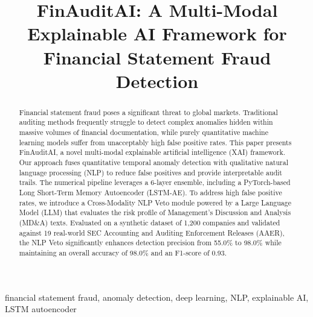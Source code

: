 \documentclass[conference]{IEEEtran}
\begin{document}
\title{FinAuditAI: A Multi-Modal Explainable AI Framework for Financial Statement Fraud Detection}

\author{
\and
{}
}

\maketitle

\begin{abstract}
Financial statement fraud poses a significant threat to global markets. Traditional auditing methods frequently struggle to detect complex anomalies hidden within massive volumes of financial documentation, while purely quantitative machine learning models suffer from unacceptably high false positive rates. This paper presents FinAuditAI, a novel multi-modal explainable artificial intelligence (XAI) framework. Our approach fuses quantitative temporal anomaly detection with qualitative natural language processing (NLP) to reduce false positives and provide interpretable audit trails. The numerical pipeline leverages a 6-layer ensemble, including a PyTorch-based Long Short-Term Memory Autoencoder (LSTM-AE). To address high false positive rates, we introduce a Cross-Modality NLP Veto module powered by a Large Language Model (LLM) that evaluates the risk profile of Management's Discussion and Analysis (MD\&A) texts. Evaluated on a synthetic dataset of 1,200 companies and validated against 19 real-world SEC Accounting and Auditing Enforcement Releases (AAER), the NLP Veto significantly enhances detection precision from 55.0\% to 98.0\% while maintaining an overall accuracy of 98.0\% and an F1-score of 0.93.
\end{abstract}

\begin{IEEEkeywords}
financial statement fraud, anomaly detection, deep learning, NLP, explainable AI, LSTM autoencoder
\end{IEEEkeywords}
\end{document}

